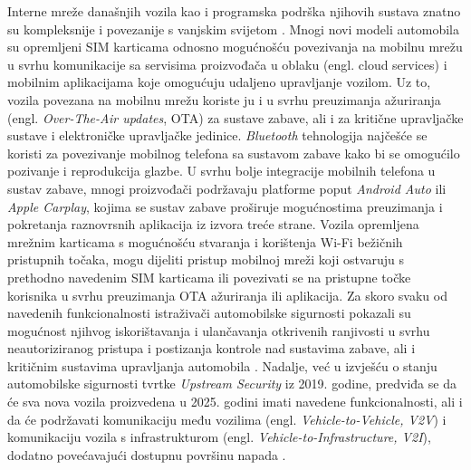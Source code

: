 \documentclass[times, utf8, diplomski, numeric]{fer}
\begin{document}
Interne mreže današnjih vozila kao i programska podrška njihovih sustava znatno su kompleksnije i povezanije s vanjskim svijetom \cite{huq2020driving}. Mnogi novi modeli automobila su opremljeni SIM karticama odnosno mogućnošću povezivanja na mobilnu mrežu u svrhu komunikacije sa servisima proizvođača u oblaku (engl. cloud services) i mobilnim aplikacijama koje omogućuju udaljeno upravljanje vozilom. Uz to, vozila povezana na mobilnu mrežu koriste ju i u svrhu preuzimanja ažuriranja (engl. \textit{Over-The-Air updates}, OTA) za sustave zabave, ali i za kritične upravljačke sustave i elektroničke upravljačke jedinice. \textit{Bluetooth} tehnologija najčešće se koristi za povezivanje mobilnog telefona sa sustavom zabave kako bi se omogućilo pozivanje i reprodukcija glazbe. U svrhu bolje integracije mobilnih telefona u sustav zabave, mnogi proizvođači podržavaju platforme poput \textit{Android Auto} ili \textit{Apple Carplay}, kojima se sustav zabave proširuje mogućnostima preuzimanja i pokretanja raznovrsnih aplikacija iz izvora treće strane. Vozila opremljena mrežnim karticama s mogućnošću stvaranja i korištenja Wi-Fi bežičnih pristupnih točaka, mogu dijeliti pristup mobilnoj mreži koji ostvaruju s prethodno navedenim SIM karticama ili povezivati se na pristupne točke korisnika u svrhu preuzimanja OTA ažuriranja ili aplikacija. Za skoro svaku od navedenih funkcionalnosti istraživači automobilske sigurnosti pokazali su mogućnost njihvog iskorištavanja i ulančavanja otkrivenih ranjivosti u svrhu neautoriziranog pristupa i postizanja kontrole nad sustavima zabave, ali i kritičnim sustavima upravljanja automobila \cite{nie2017free, nie2018over, cai20190, tencent2018bmw, miller2015remote, curry2023web}. Nadalje, već u izvješću o stanju automobilske sigurnosti tvrtke \textit{Upstream Security} iz 2019. godine, predviđa se da će sva nova vozila proizvedena u 2025. godini imati navedene funkcionalnosti, ali i da će podržavati komunikaciju među vozilima (engl. \textit{Vehicle-to-Vehicle, V2V}) i komunikaciju vozila s infrastrukturom (engl. \textit{Vehicle-to-Infrastructure, V2I}), dodatno povećavajući dostupnu površinu napada \cite{upstream2019report}.
\end{document}
